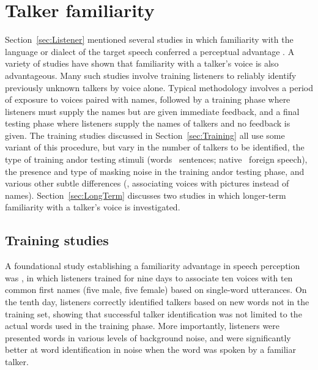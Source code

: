
\section{Talker familiarity\label{sec:Fam}}
Section~\ref{sec:Listener} mentioned several studies in which familiarity with the language or dialect of the target speech conferred a perceptual advantage \citep[\eg,][]{BentBradlow2003, ImaiEtAl2005, PinetEtAl2011}.  A variety of studies have shown that familiarity with a talker’s voice is also advantageous.  Many such studies involve training listeners to reliably identify previously unknown talkers by voice alone.  Typical methodology involves a period of exposure to voices paired with names, followed by a training phase where listeners must supply the names but are given immediate feedback, and a final testing phase where listeners supply the names of talkers and no feedback is given.  The training studies discussed in Section~\ref{sec:Training} all use some variant of this procedure, but vary in the number of talkers to be identified, the type of training and\slsh or testing stimuli (words \vs\ sentences; native \vs\ foreign speech), the presence and type of masking noise in the training and\slsh or testing phase, and various other subtle differences (\eg, associating voices with pictures instead of names).  Section~\ref{sec:LongTerm} discusses two studies in which longer-term familiarity with a talker’s voice is investigated.

\subsection{Training studies\label{sec:Training}}
A foundational study establishing a familiarity advantage in speech perception was \citet{NygaardEtAl1994}, in which listeners trained for nine days to associate ten voices with ten common first names (five male, five female) based on single-word utterances.  On the tenth day, listeners correctly identified talkers based on new words not in the training set, showing that successful talker identification was not limited to the actual words used in the training phase.  More importantly, listeners were presented words in various levels of background noise, and were significantly better at word identification in noise when the word was spoken by a familiar talker.

